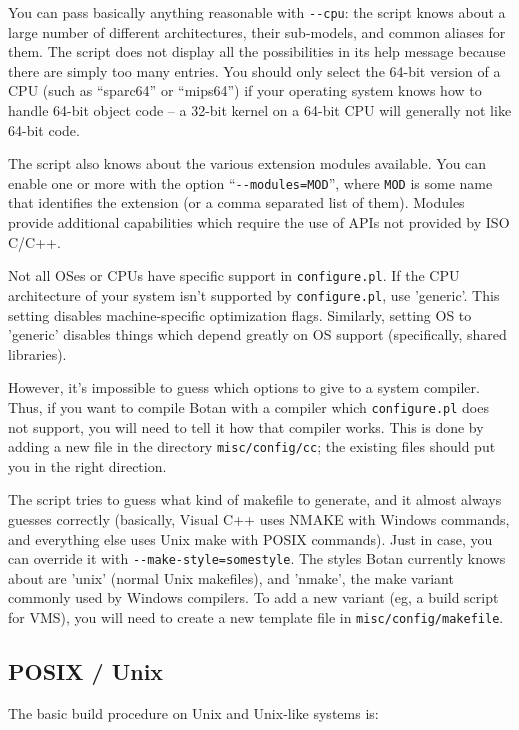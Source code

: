 \documentclass{article}
\newcommand{\filename}[1]{\texttt{#1}}
\begin{document}
You can pass basically anything reasonable with \verb|--cpu|: the
script knows about a large number of different architectures, their
sub-models, and common aliases for them. The script does not display
all the possibilities in its help message because there are simply too
many entries. You should only select the 64-bit version of a CPU (such
as ``sparc64'' or ``mips64'') if your operating system knows how to
handle 64-bit object code -- a 32-bit kernel on a 64-bit CPU will
generally not like 64-bit code.

The script also knows about the various extension modules
available. You can enable one or more with the option
``\verb|--modules=MOD|'', where \verb|MOD| is some name that
identifies the extension (or a comma separated list of them). Modules
provide additional capabilities which require the use of APIs not
provided by ISO C/C++.

Not all OSes or CPUs have specific support in \filename{configure.pl}. If the
CPU architecture of your system isn't supported by \filename{configure.pl}, use
'generic'. This setting disables machine-specific optimization
flags. Similarly, setting OS to 'generic' disables things which depend greatly
on OS support (specifically, shared libraries).

However, it's impossible to guess which options to give to a system
compiler.  Thus, if you want to compile Botan with a compiler which
\filename{configure.pl} does not support, you will need to tell it how
that compiler works. This is done by adding a new file in the
directory \filename{misc/config/cc}; the existing files should put you
in the right direction.

The script tries to guess what kind of makefile to generate, and it
almost always guesses correctly (basically, Visual C++ uses NMAKE with
Windows commands, and everything else uses Unix make with POSIX
commands). Just in case, you can override it with
\verb|--make-style=somestyle|. The styles Botan currently knows about
are 'unix' (normal Unix makefiles), and 'nmake', the make variant
commonly used by Windows compilers. To add a new variant (eg, a build
script for VMS), you will need to create a new template file in
\filename{misc/config/makefile}.

\pagebreak

\subsection{POSIX / Unix}

The basic build procedure on Unix and Unix-like systems is:
\end{document}
